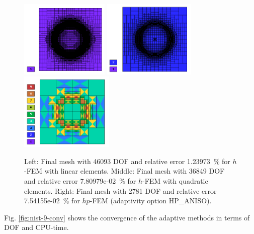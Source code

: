 \documentclass[12pt]{elsarticle}
\begin{document}
\begin{figure}[H]
\centering
\includegraphics[height=3.7cm]{nist/nist-9/mesh_h1_aniso.png}
\includegraphics[height=3.7cm]{nist/nist-9/mesh_h2_aniso.png}
\includegraphics[height=3.7cm]{nist/nist-9/mesh_hp_aniso.png}
\caption{
Left: Final mesh with 46093 DOF and relative error 1.23973~\% for $h$-FEM with linear elements.
Middle: Final mesh with 36849 DOF and relative error 7.80979e-02~\% for $h$-FEM with quadratic elements.
Right: Final mesh with 2781 DOF and relative error 7.54155e-02~\% for $hp$-FEM (adaptivity option HP\_ANISO).}
\label{fig:nist-9-hp-aniso}
\end{figure}

Fig. \ref{fig:nist-9-conv} shows the convergence of the adaptive methods in terms of DOF and CPU-time.
\end{document}
